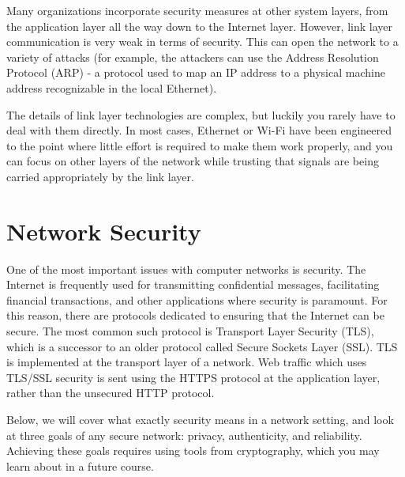 Many organizations incorporate security measures at other system layers, from the application layer all the way down to the Internet layer. However, link layer communication is very weak in terms of security. This can open the network to a variety of attacks (for example, the attackers can use the Address Resolution Protocol (ARP) - a protocol used to map an IP address to a physical machine address recognizable in the local Ethernet).%

The details of link layer technologies are complex, but luckily you rarely have to deal with them directly. In most cases, Ethernet or Wi-Fi have been engineered to the point where little effort is required to make them work properly, and you can focus on other layers of the network while trusting that signals are being carried appropriately by the link layer.

\section{Network Security}\label{sec:network:security}

One of the most important issues with computer networks is security. The Internet is frequently used for transmitting confidential messages, facilitating financial transactions, and other applications where security is paramount. For this reason, there are protocols dedicated to ensuring that the Internet can be secure. The most common such protocol is Transport Layer Security (TLS), which is a successor to an older protocol called Secure Sockets Layer (SSL). TLS is implemented at the transport layer of a network. Web traffic which uses TLS/SSL security is sent using the HTTPS protocol at the application layer, rather than the unsecured HTTP protocol.


Below, we will cover what exactly security means in a network setting, and look at three goals of any secure network: privacy, authenticity, and reliability. Achieving these goals requires using tools from cryptography, which you may learn about in a future course.

